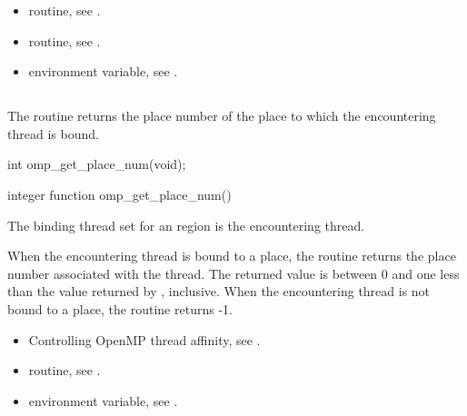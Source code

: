 \crossreferences
\begin{itemize}
\item {} routine, see 
.

\item {} routine, see 
.

\item {} environment variable, see 
.
\end{itemize}




\subsection{}
\label{subsec:omp_get_place_num}

\summary
The  routine returns the place number of the place to which the encountering thread is bound.

\format
\ccppspecificstart
\begin{boxedcode}
int omp\_get\_place\_num(void);
\end{boxedcode}
\ccppspecificend

\fortranspecificstart
\begin{boxedcode}
integer function omp\_get\_place\_num()
\end{boxedcode}
\fortranspecificend

\binding
The binding thread set for an  region is the encountering thread.

\effect
When the encountering thread is bound to a place, the 
 routine returns the place number associated 
with the thread. The returned value is between 0 and one less than the 
value returned by , inclusive. When the 
encountering thread is not bound to a place, the routine returns -1.

\crossreferences
\begin{itemize}
\item Controlling OpenMP thread affinity, see 
. 

\item {} routine, see 
.

\item {} environment variable, see 
.
\end{itemize}





